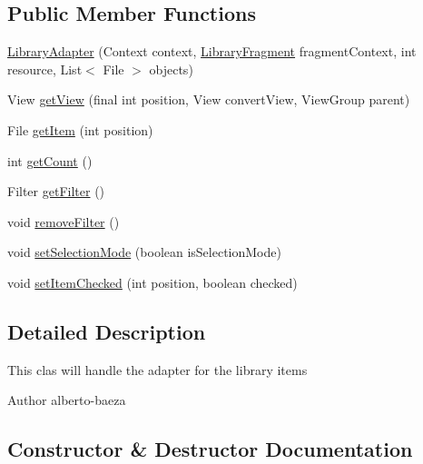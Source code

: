 \subsection*{Public Member Functions}
\begin{DoxyCompactItemize}
\item 
\hyperlink{classandroid_1_1app_1_1printerapp_1_1library_1_1_library_adapter_a1d9e754e26f24a19d650e82a4779ad58}{Library\+Adapter} (Context context, \hyperlink{classandroid_1_1app_1_1printerapp_1_1library_1_1_library_fragment}{Library\+Fragment} fragment\+Context, int resource, List$<$ File $>$ objects)
\item 
View \hyperlink{classandroid_1_1app_1_1printerapp_1_1library_1_1_library_adapter_abaab3df83e35648b850690869eeca562}{get\+View} (final int position, View convert\+View, View\+Group parent)
\item 
File \hyperlink{classandroid_1_1app_1_1printerapp_1_1library_1_1_library_adapter_a7b16e7e0c9040a9c7bb9b5db2b7b8bac}{get\+Item} (int position)
\item 
int \hyperlink{classandroid_1_1app_1_1printerapp_1_1library_1_1_library_adapter_a0016dfdbabb897c93f30d3c525f3107c}{get\+Count} ()
\item 
Filter \hyperlink{classandroid_1_1app_1_1printerapp_1_1library_1_1_library_adapter_a5dbc95a724caccadb64f06c928bd5af6}{get\+Filter} ()
\item 
void \hyperlink{classandroid_1_1app_1_1printerapp_1_1library_1_1_library_adapter_a9ce3bc9f6c08f23e44711329510f4307}{remove\+Filter} ()
\item 
void \hyperlink{classandroid_1_1app_1_1printerapp_1_1library_1_1_library_adapter_a0f824791d3c05f57f831eba3bec5f3f3}{set\+Selection\+Mode} (boolean is\+Selection\+Mode)
\item 
void \hyperlink{classandroid_1_1app_1_1printerapp_1_1library_1_1_library_adapter_a31b50dce3640667f332e21e8be50609d}{set\+Item\+Checked} (int position, boolean checked)
\end{DoxyCompactItemize}


\subsection{Detailed Description}
This clas will handle the adapter for the library items

\begin{DoxyAuthor}{Author}
alberto-\/baeza 
\end{DoxyAuthor}


\subsection{Constructor \& Destructor Documentation}
\mbox{\label{classandroid_1_1app_1_1printerapp_1_1library_1_1_library_adapter_a1d9e754e26f24a19d650e82a4779ad58}} 
